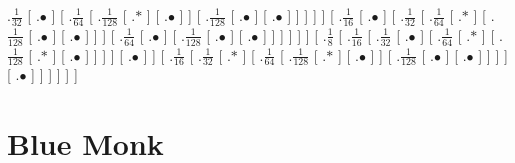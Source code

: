 \documentclass[a4paper,10pt]{article}
\begin{document}
\begin{landscape}
{.$\frac{1}{32}$  [ .$\bullet$ ]  [ .$\frac{1}{64}$  [ .$\frac{1}{128}$  [ .$*$ ]  [ .$\bullet$ ]  ]  [ .$\frac{1}{128}$  [ .$\bullet$ ]  [ .$\bullet$ ]  ]  ]  ]  ]  [ .$\frac{1}{16}$  [ .$\bullet$ ]  [ .$\frac{1}{32}$  [ .$\frac{1}{64}$  [ .$*$ ]  [ .$\frac{1}{128}$  [ .$\bullet$ ]  [ .$\bullet$ ]  ]  ]  [ .$\frac{1}{64}$  [ .$\bullet$ ]  [ .$\frac{1}{128}$  [ .$\bullet$ ]  [ .$\bullet$ ]  ]  ]  ]  ]  ]  [ .$\frac{1}{8}$  [ .$\frac{1}{16}$  [ .$\frac{1}{32}$  [ .$\bullet$ ]  [ .$\frac{1}{64}$  [ .$*$ ]  [ .$\frac{1}{128}$  [ .$*$ ]  [ .$\bullet$ ]  ]  ]  ]  [ .$\bullet$ ]  ]  [ .$\frac{1}{16}$  [ .$\frac{1}{32}$  [ .$*$ ]  [ .$\frac{1}{64}$  [ .$\frac{1}{128}$  [ .$*$ ]  [ .$\bullet$ ]  ]  [ .$\frac{1}{128}$  [ .$\bullet$ ]  [ .$\bullet$ ]  ]  ]  ]  [ .$\bullet$ ]  ]  ]  ]  ]  ] 
}
\section*{Blue Monk}
\resizebox{\linewidth}{!}{%
\Tree
}
\end{landscape}
\end{document}
